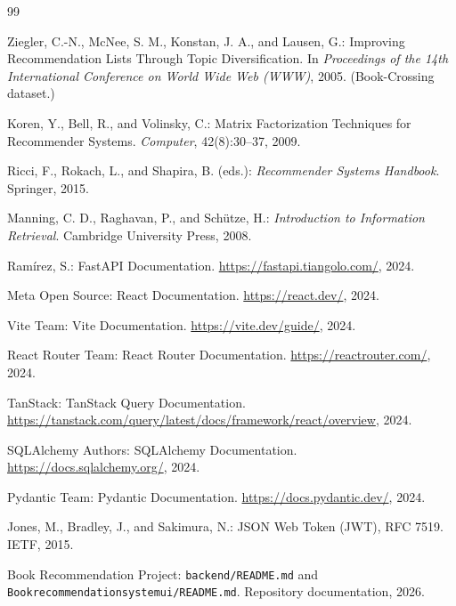 \documentclass[12pt,a4paper]{report}
\begin{document}
\clearpage
{}
{}
\begin{thebibliography}{99}

Ziegler, C.-N., McNee, S. M., Konstan, J. A., and Lausen, G.:
\newblock Improving Recommendation Lists Through Topic Diversification.
\newblock In \emph{Proceedings of the 14th International Conference on World Wide Web (WWW)}, 2005.
\newblock (Book-Crossing dataset.)

Koren, Y., Bell, R., and Volinsky, C.:
\newblock Matrix Factorization Techniques for Recommender Systems.
\newblock \emph{Computer}, 42(8):30--37, 2009.

Ricci, F., Rokach, L., and Shapira, B. (eds.):
\newblock \emph{Recommender Systems Handbook}.
\newblock Springer, 2015.

Manning, C. D., Raghavan, P., and Sch\"utze, H.:
\newblock \emph{Introduction to Information Retrieval}.
\newblock Cambridge University Press, 2008.

Ramírez, S.:
\newblock FastAPI Documentation.
\newblock \url{https://fastapi.tiangolo.com/}, 2024.

Meta Open Source:
\newblock React Documentation.
\newblock \url{https://react.dev/}, 2024.

Vite Team:
\newblock Vite Documentation.
\newblock \url{https://vite.dev/guide/}, 2024.

React Router Team:
\newblock React Router Documentation.
\newblock \url{https://reactrouter.com/}, 2024.

TanStack:
\newblock TanStack Query Documentation.
\newblock \url{https://tanstack.com/query/latest/docs/framework/react/overview}, 2024.

SQLAlchemy Authors:
\newblock SQLAlchemy Documentation.
\newblock \url{https://docs.sqlalchemy.org/}, 2024.

Pydantic Team:
\newblock Pydantic Documentation.
\newblock \url{https://docs.pydantic.dev/}, 2024.

Jones, M., Bradley, J., and Sakimura, N.:
\newblock JSON Web Token (JWT), RFC 7519.
\newblock IETF, 2015.

Book Recommendation Project:
\newblock \texttt{backend/README.md} and \texttt{Bookrecommendationsystemui/README.md}.
\newblock Repository documentation, 2026.

\end{thebibliography}
\end{document}
